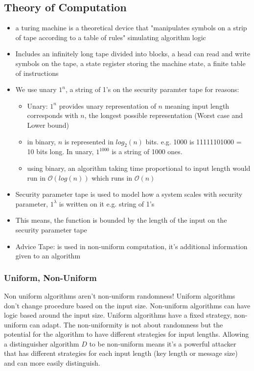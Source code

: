 \subsection*{Theory of Computation}
\begin{itemize}
    \item a turing machine is a theoretical device that "manipulates symbols on a strip of tape according to a table of rules" simulating algorithm logic
    \item Includes an infinitely long tape divided into blocks, a head can read and write symbols on the tape, a state register storing the machine state, a finite table of instructions
    \item We use unary $1^n$, a string of 1's on the security paramter tape for reasons:
    \begin{itemize}
        \item Unary: $1^n$ provides unary representation of $n$ meaning input length corresponds with $n$, the longest possible representation (Worst case and Lower bound)
        \item in binary, $n$ is represented in $log_2(n)$ bits. e.g. 1000 is 11111101000 = 10 bits long. In unary, $1^{1000}$ is a string of 1000 ones.
        \item using binary, an algorithm taking time proportional to input length would run in $\mathcal{O}(log(n))$ which runs in $\mathcal{O}(n)$
    \end{itemize}
    \item Security parameter tape is used to model how a system scales with security parameter, $1^{\lambda}$ is written on it e.g. string of 1's
    \item This means, the function is bounded by the length of the input on the security parameter tape
    \item Advice Tape: is used in non-uniform computation, it's additional information given to an algorithm 
\end{itemize}


\subsubsection*{Uniform, Non-Uniform}
Non uniform algorithms aren't non-uniform randomness! 
Uniform algorithms don't change procedure based on the input size. Non-uniform algorithms can have logic based around the input size.
Uniform algorithms have a fixed strategy, non-uniform can adapt. 
The non-uniformity is not about randomness but the potential for the algorithm to have different strategies for input lengths.
Allowing a distinguisher algorithm $D$ to be non-uniform means it's a powerful attacker that has different strategies for each input length (key length or message size) and can more easily distinguish.

